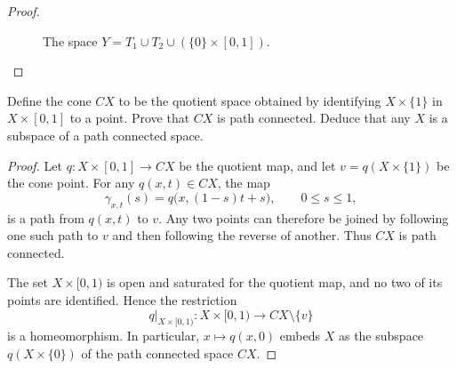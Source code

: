 \documentclass[addpoints,10pt]{exam}
\theoremstyle{plain}
\theoremstyle{definition}
\newtheorem{prob}[thm]{Problem}
\theoremstyle{plain}
\theoremstyle{definition}
\let\oldprob\prob
\let\endoldprob\endprob
\renewenvironment{prob}
  {\begin{singlespace}\oldprob}
  {\endoldprob\end{singlespace}}
\newcommand{\QQ}{\ensuremath{\mathbb{Q}}}
\begin{document}
\begin{proof}
\begin{figure}[h]
    \caption{The space
    $Y=T_1\cup T_2\cup(\{0\}\times[0,1])$.}
\end{figure}
\end{proof}

\begin{prob}
Define the cone $CX$ to be the quotient space obtained by identifying
$X\times\{1\}$ in $X\times[0,1]$ to a point. Prove that $CX$ is path
connected. Deduce that any $X$ is a subspace of a path connected space.
\end{prob}

\begin{proof}
Let $q\colon X\times[0,1]\to CX$ be the quotient map, and let
$v=q(X\times\{1\})$ be the cone point. For any $q(x,t)\in CX$, the map
\[
\gamma_{x,t}(s)=q\bigl(x,(1-s)t+s\bigr),
\qquad 0\leq s\leq1,
\]
is a path from $q(x,t)$ to $v$. Any two points can therefore be joined by
following one such path to $v$ and then following the reverse of another.
Thus $CX$ is path connected.

The set $X\times[0,1)$ is open and saturated for the quotient map, and no two
of its points are identified. Hence the restriction
\[
q\big|_{X\times[0,1)}\colon X\times[0,1)
\longrightarrow CX\setminus\{v\}
\]
is a homeomorphism. In particular, $x\mapsto q(x,0)$ embeds $X$ as the
subspace $q(X\times\{0\})$ of the path connected space $CX$.
\end{proof}
\end{document}
